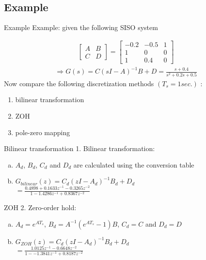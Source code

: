 \subsection{Example}
\begin{frame}{Example}
Example: given the following SISO system

\begin{align*}
{
\left[
    \begin{array}{c|c}
        A & B \\ \hline
        C & D
    \end{array}
\right]
=
\left[
\begin{array}{cc|c}
-0.2 & −0.5 &1 \\ 
1 & 0 &0 \\ \hline
1 &  0.4  & 0
\end{array}\right]
}
\end{align*}
\begin{align*}
\Rightarrow G(s)=C(sI-A)^{-1}B+D=\frac{s+0.4}{s^2+0.2s+0.5}
\end{align*}
Now compare the following discretization methods $(T_s = 1
sec.)$ :

\begin{enumerate}
\item bilinear transformation
\item ZOH
\item pole-zero mapping
\end{enumerate}
\end{frame}

\begin{frame}{Bilinear transformation}
1. Bilinear transformation:
\begin{enumerate}[(a)]
    \item
    $A_d$, $B_d$, $C_d$ and $D_d$ are calculated using the conversion table
    \item
    $G_{bilinear}(z)=C_d(zI-A_d)^{-1}B_d+D_d$\\
    \vspace{0.2cm}
    $=\frac{0.4898+0.1633z^{-1}-0.3265z^{-2}}{1-1.4286z^{-1}+0.8367z^{-2}}$
\end{enumerate}
\end{frame}

\begin{frame}{ZOH}
2. Zero-order hold: 
\begin{enumerate}[(a)]
    \item
    $A_d=e^{AT_s}$, $B_d=A^{-1}(e^{AT_s}-1)B$, $C_d=C$ and $D_d=D$
    \item
    $G_{ZOH}(z)=C_d(zI-A_d)^{-1}B_d+D_d$\\
    \vspace{0.2cm}
    $=\frac{1.0125z^{-1}-0.6648z^{-2}}{1-− 1.3841z^{-1}+0.8187z^{-2}}$
\end{enumerate}
\end{frame}

